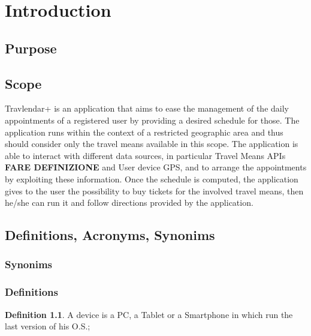 \chapter{Introduction}

\section{Purpose}

\section{Scope}

Travlendar+ is an application that aims to ease the management of the daily appointments of a registered user by providing a desired schedule for those. 
The application runs within the context of a restricted geographic area and thus should consider only the travel means available in this scope.
The application is able to interact with different data sources, in particular Travel Means APIs \textbf{FARE DEFINIZIONE} and User device GPS, and to arrange the appointments by exploiting these information.
Once the schedule is computed, the application gives to the user the possibility to buy tickets for the involved travel means, then he/she can run it and follow directions provided by the application. 

\section{Definitions, Acronyms, Synonims}

\subsection{Synonims}

\subsection{Definitions}
\theoremstyle{definition}
\newtheorem{definition}{Definition}[section]
 
%
\begin{definition} \label{def:device}
A device is a PC, a Tablet or a Smartphone in which run the last version of his O.S.;
\end{definition}

